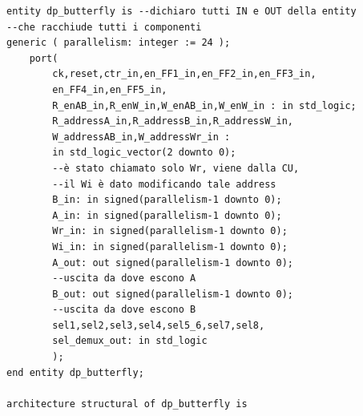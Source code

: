 \documentclass[a4paper, titlepage]{article}
\begin{document}
\begin{description}
\begin{verbatim}
entity dp_butterfly is --dichiaro tutti IN e OUT della entity 
--che racchiude tutti i componenti
generic ( parallelism: integer := 24 );
	port(
		ck,reset,ctr_in,en_FF1_in,en_FF2_in,en_FF3_in,
		en_FF4_in,en_FF5_in,
		R_enAB_in,R_enW_in,W_enAB_in,W_enW_in : in std_logic;
		R_addressA_in,R_addressB_in,R_addressW_in,
		W_addressAB_in,W_addressWr_in :
		in std_logic_vector(2 downto 0); 
		--è stato chiamato solo Wr, viene dalla CU, 
		--il Wi è dato modificando tale address
		B_in: in signed(parallelism-1 downto 0);
		A_in: in signed(parallelism-1 downto 0);
		Wr_in: in signed(parallelism-1 downto 0);
		Wi_in: in signed(parallelism-1 downto 0);
		A_out: out signed(parallelism-1 downto 0); 
		--uscita da dove escono A 
		B_out: out signed(parallelism-1 downto 0); 
		--uscita da dove escono B
		sel1,sel2,sel3,sel4,sel5_6,sel7,sel8,
		sel_demux_out: in std_logic 
		);
end entity dp_butterfly;

architecture structural of dp_butterfly is 


\end{verbatim}
\end{description}
\end{document}
